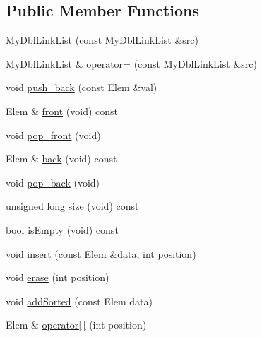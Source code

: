 \subsection*{Public Member Functions}
\begin{DoxyCompactItemize}
\item 
\hyperlink{classnsMyDblLinkList_1_1MyDblLinkList_a3ea3bd9012c9a5512255f69f4e92a04e}{My\-Dbl\-Link\-List} (const \hyperlink{classnsMyDblLinkList_1_1MyDblLinkList}{My\-Dbl\-Link\-List} \&src)
\item 
\hyperlink{classnsMyDblLinkList_1_1MyDblLinkList}{My\-Dbl\-Link\-List} \& \hyperlink{classnsMyDblLinkList_1_1MyDblLinkList_adb891dd63c80ca95c0112c26dcc25ddf}{operator=} (const \hyperlink{classnsMyDblLinkList_1_1MyDblLinkList}{My\-Dbl\-Link\-List} \&src)
\item 
void \hyperlink{classnsMyDblLinkList_1_1MyDblLinkList_ad5adbd0d21f414c586fe2e4c29ecb968}{push\-\_\-back} (const Elem \&val)
\item 
Elem \& \hyperlink{classnsMyDblLinkList_1_1MyDblLinkList_a95d18c26b65859a681f8d3d21452c2b0}{front} (void) const 
\item 
void \hyperlink{classnsMyDblLinkList_1_1MyDblLinkList_a8fcb55e1577f9097b92d9edb34f70a3e}{pop\-\_\-front} (void)
\item 
Elem \& \hyperlink{classnsMyDblLinkList_1_1MyDblLinkList_a2258fc5ae8734bf096a4afff20c5e038}{back} (void) const 
\item 
void \hyperlink{classnsMyDblLinkList_1_1MyDblLinkList_a8f5da5782a5041ba160e9f3225cb05a7}{pop\-\_\-back} (void)
\item 
unsigned long \hyperlink{classnsMyDblLinkList_1_1MyDblLinkList_a04da8466e0d37191c782b234de856c3b}{size} (void) const 
\item 
bool \hyperlink{classnsMyDblLinkList_1_1MyDblLinkList_ab9c514b420e152d1f8d5f76f131f6b97}{is\-Empty} (void) const 
\item 
void \hyperlink{classnsMyDblLinkList_1_1MyDblLinkList_aed83c438f2b699771e5bf2ef9420beb1}{insert} (const Elem \&data, int position)
\item 
void \hyperlink{classnsMyDblLinkList_1_1MyDblLinkList_a864d0f3d60271a31a5ec1029f0e6ffdb}{erase} (int position)
\item 
void \hyperlink{classnsMyDblLinkList_1_1MyDblLinkList_a96e74ce8355d2e34714304ff6ed0e7a7}{add\-Sorted} (const Elem data)
\item 
Elem \& \hyperlink{classnsMyDblLinkList_1_1MyDblLinkList_ae9cc0f5a99478a0314e9a0d5ad48a296}{operator\mbox{[}$\,$\mbox{]}} (int position)

\end{DoxyCompactItemize}
